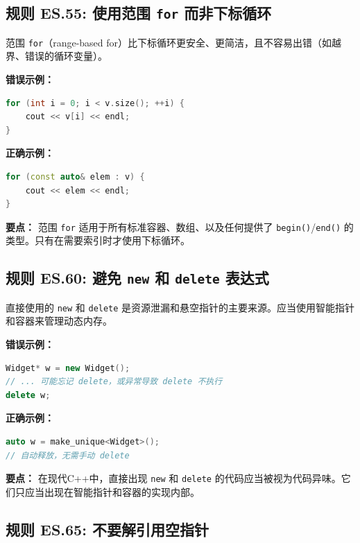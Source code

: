\subsection*{\textbf{规则 ES.55:} 使用范围 \texttt{for} 而非下标循环}

范围 \texttt{for}（range-based for）比下标循环更安全、更简洁，且不容易出错（如越界、错误的循环变量）。

\textbf{错误示例：}

\begin{lstlisting}[language=C++]
for (int i = 0; i < v.size(); ++i) {
    cout << v[i] << endl;
}
\end{lstlisting}

\textbf{正确示例：}

\begin{lstlisting}[language=C++]
for (const auto& elem : v) {
    cout << elem << endl;
}
\end{lstlisting}

\textbf{要点：} 范围 \texttt{for} 适用于所有标准容器、数组、以及任何提供了 \texttt{begin()}/\allowbreak{}\texttt{end()} 的类型。只有在需要索引时才使用下标循环。

\subsection*{\textbf{规则 ES.60:} 避免 \texttt{new} 和 \texttt{delete} 表达式}

直接使用的 \texttt{new} 和 \texttt{delete} 是资源泄漏和悬空指针的主要来源。应当使用智能指针和容器来管理动态内存。

\textbf{错误示例：}

\begin{lstlisting}[language=C++]
Widget* w = new Widget();
// ... 可能忘记 delete，或异常导致 delete 不执行
delete w;
\end{lstlisting}

\textbf{正确示例：}

\begin{lstlisting}[language=C++]
auto w = make_unique<Widget>();
// 自动释放，无需手动 delete
\end{lstlisting}

\textbf{要点：} 在现代C++中，直接出现 \texttt{new} 和 \texttt{delete} 的代码应当被视为代码异味。它们只应当出现在智能指针和容器的实现内部。

\subsection*{\textbf{规则 ES.65:} 不要解引用空指针}


